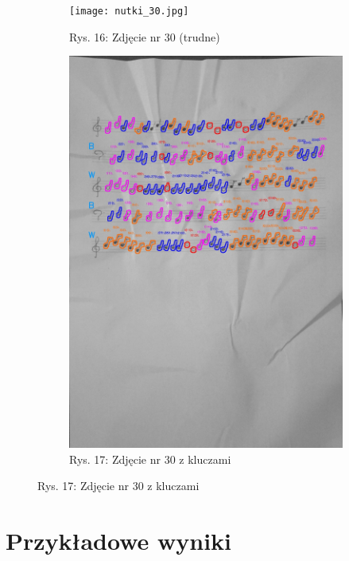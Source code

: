 \documentclass[11pt]{article}
\begin{document}
\begin{figure}
\begin{subfigure}[b]{0.475\textwidth}
        \texttt{[image: nutki\_30.jpg]}
        \caption{Rys. 16: Zdjęcie nr 30 (trudne)}
        \label{fig:sub3}
    \end{subfigure}
    \quad
    \begin{subfigure}[b]{0.475\textwidth}
        \centering
        \graphicspath{ {keys/} }
        \includegraphics[width=\textwidth]{image_30.jpg}
        \caption{Rys. 17: Zdjęcie nr 30 z kluczami}
        \label{fig:sub 4}
    \end{subfigure}
    \label{fig 1}
\end{figure}

\FloatBarrier


\section{Przykładowe wyniki}
\end{document}
